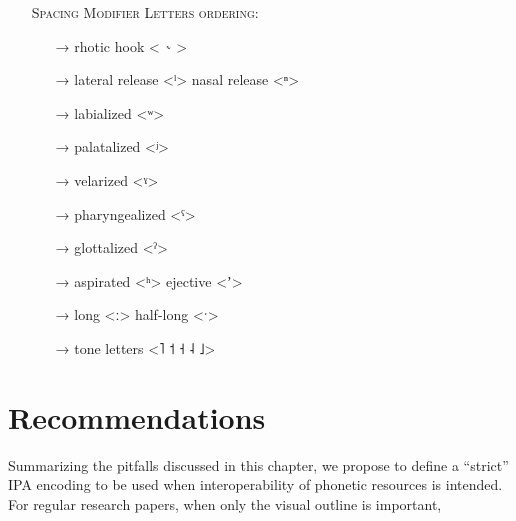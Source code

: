 \begin{itemize}
	\item[] \textsc{Spacing Modifier Letters ordering:}
	\begin{itemize}
	  \item[→] rhotic hook <{\large \ ˞} >
	  \item[→] lateral release <ˡ> \textbar{} nasal release <ⁿ>
	  \item[→] labialized <ʷ>
	  \item[→] palatalized <ʲ>
	  \item[→] velarized <ˠ>
	  \item[→] pharyngealized <ˤ>
	  \item[→] glottalized <ˀ>
	  \item[→] aspirated <ʰ> \textbar{} ejective <ʼ>
	  \item[→] long <ː> \textbar{} half-long <ˑ>
	  \item[→] tone letters <˥ ˦ ˧ ˨ ˩>
	\end{itemize}
\end{itemize}

\section{Recommendations}
\label{ipa-recommendations}

Summarizing the pitfalls discussed in this chapter, we propose to define a 
``strict'' IPA encoding to be used when interoperability of phonetic resources 
is intended. For regular research papers, when only the visual outline is 
important, 

  
 \label{tab:ipa_letters}
 \tabletail{\bottomrule}
  
